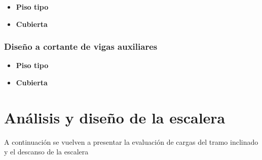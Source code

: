\documentclass[12pt]{article}
\begin{document}
\begin{itemize}
    \item \textbf{Piso tipo}\\
    \vspace{1cm}
    
    
    
    
    
    \newpage
    \item \textbf{Cubierta}
    
    
    
    
\end{itemize}


\subsubsection{Diseño a cortante de vigas auxiliares}

\begin{itemize}
    \item \textbf{Piso tipo}\\
    \vspace{1cm}
    
    
    
    
    
    \vspace{5cm}
    \item \textbf{Cubierta}
    
    
    
    
\end{itemize}



\section{Análisis y diseño de la escalera}
A continuación se vuelven a presentar la evaluación de cargas del tramo inclinado y el descanso de la escalera
\end{document}
